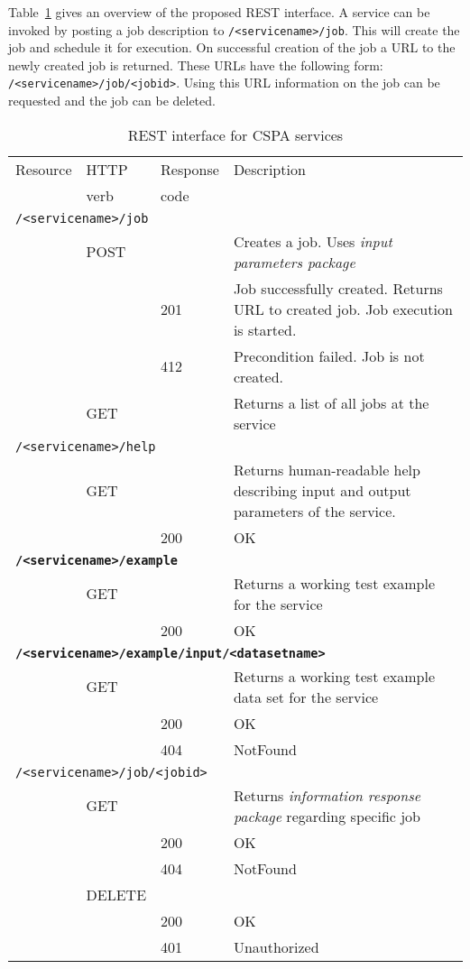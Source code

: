 \documentclass[a4paper]{article}
\begin{document}
Table~\ref{tab:interf} gives an overview of the proposed REST interface.  A
service can be invoked by posting a job description to
\texttt{/<servicename>/job}. This will create the job and schedule it for
execution. On successful creation of the job a URL to the newly created job is
returned. These URLs have the following form:
\texttt{/<servicename>/job/<jobid>}.  Using this URL information on the job can
be requested and the job can be deleted.

\begin{table}
  \caption{REST interface for CSPA services}
  \label{tab:interf}
  \begin{tabular}{l l l p{}}
    \toprule
    Resource & HTTP & Response & Description \\
             & verb & code     &  \\

    \midrule
    \multicolumn{4}{l}{\texttt{/<servicename>/job}} \\
    & POST &  & Creates a job. Uses \emph{input parameters package} \\
    &   & 201 & Job successfully created. Returns URL to created job. Job execution is started. \\
    &   & 412 & Precondition failed. Job is not created.\\
    & GET  &  & Returns a list of all jobs at the service \\

    \multicolumn{4}{l}{\texttt{/<servicename>/help}} \\
    & GET &   & Returns human-readable help describing input and output parameters of the service. \\
    &   & 200  & OK \\

    \multicolumn{4}{l}{\bf\texttt{/<servicename>/example}} \\
    & GET &   & Returns a working test example for the service \\
    &   & 200  & OK \\

    \multicolumn{4}{l}{\bf\texttt{/<servicename>/example/input/<datasetname>}} \\
    & GET &   & Returns a working test example data set for the service \\
    &   & 200  & OK \\
    &   & 404  & NotFound \\

    \multicolumn{4}{l}{\texttt{/<servicename>/job/<jobid>}} \\
    & GET &    & Returns \emph{information response package} regarding specific job \\
    &   & 200  & OK \\
    &   & 404  & NotFound \\
    & DELETE & &  \\
    &   & 200  & OK \\
    &   & 401  & Unauthorized \\


\end{tabular}
\end{table}
\end{document}
